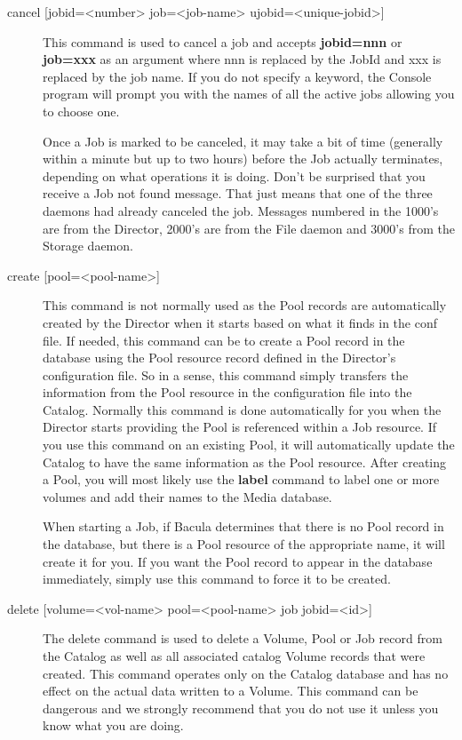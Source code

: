 \begin{description}
\item [{cancel [jobid={\textless}number{\textgreater} job={\textless}job-name{\textgreater} ujobid={\textless}unique-jobid{\textgreater}]}]
   This command is used to cancel a job and accepts {\bf jobid=nnn} or {\bf
   job=xxx} as an argument where nnn is replaced by the JobId and xxx is
   replaced by the job name.  If you do not specify a keyword, the Console
   program will prompt you with the names of all the active jobs allowing
   you to choose one.

   Once a Job is marked to be canceled, it may take a bit of time
   (generally within a minute but up to two hours) before the Job actually
   terminates, depending on what operations it is doing.
   Don't be surprised that you receive a Job not found message. That just
   means that one of the three daemons had already canceled the job.
   Messages numbered in the 1000's are from the Director, 2000's are from
   the File daemon and 3000's from the Storage daemon.


\item [{create [pool={\textless}pool-name{\textgreater}]}]
   This command is not normally used as the Pool records are automatically
   created by the Director when it starts based on what it finds in
   the conf file.  If needed, this command can be
   to create a Pool record in the database using the
   Pool resource record defined in the Director's configuration file.  So
   in a sense, this command simply transfers the information from the Pool
   resource in the configuration file into the Catalog.  Normally this
   command is done automatically for you when the Director starts providing
   the Pool is referenced within a Job resource.  If you use this command
   on an existing Pool, it will automatically update the Catalog to have
   the same information as the Pool resource.  After creating a Pool, you
   will most likely use the {\bf label} command to label one or more
   volumes and add their names to the Media database.

   When starting a Job, if Bacula determines that there is no Pool record
   in the database, but there is a Pool resource of the appropriate name,
   it will create it for you.  If you want the Pool record to appear in the
   database immediately, simply use this command to force it to be created.

\item [{delete [volume={\textless}vol-name{\textgreater} pool={\textless}pool-name{\textgreater}  job
   jobid={\textless}id{\textgreater}]}]
   The delete command is used to delete a Volume, Pool or Job record from
   the Catalog as well as all associated catalog Volume records that were
   created.  This command operates only on the Catalog database and has no
   effect on the actual data written to a Volume.  This command can be
   dangerous and we strongly recommend that you do not use it unless you
   know what you are doing.


\end{description}
